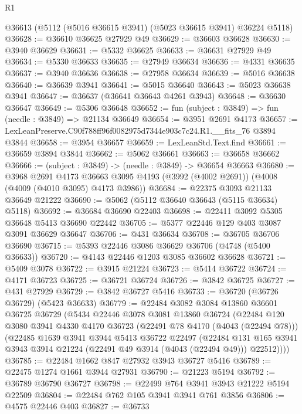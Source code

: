 \begin{lexlean}{R1}
\begin{coremodule}
  @36613 (@5112 (@5016 @36615 @3941) (@5023 @36615 @3941) @36224 @5118)
@36628 := @36610 @36625 @27929 @49
@36629 := @36603 @36628
@36630 := @3940 @36629
@36631 := @5332 @36625
@36633 := @36631 @27929 @49
@36634 := @5330 @36633
@36635 := @27949 @36634
@36636 := @4331 @36635
@36637 := @3940 @36636
@36638 := @27958 @36634
@36639 := @5016 @36638
@36640 := @36639 @3941
@36641 := @5015 @36640
@36643 := @5023 @36638 @3941
@36647 := @36637 (@36641 @36643 @4261 @3943)
@36648 := @36630 @36647
@36649 := @5306 @36648
@36652 := fun (subject : @3849) => fun (needle : @3849) => @21134 @36649
@36654 := @3951 @2691 @4173
@36657 := LexLeanPreserve.C90f788ff96f0082975d7344e903c7c24.R1.__fits_76 @3894 @3844
@36658 := @3954 @36657
@36659 := LexLeanStd.Text.find
@36661 := @36659 @3894 @3844
@36662 := @5062 @36661
@36663 := @36658 @36662
@36666 := (subject : @3849) -> (needle : @3849) -> @36654 @36663
@36680 := @3968
    @2691
    @4173
    @36663
    @3095
    @4193
    (@3992 (@4002 @2691))
    (@4008 (@4009 (@4010 @3095) @4173 @3986))
@36684 := @22375 @3093 @21133 @36649 @21222
@36690 := @5062 (@5112 @36640 @36643 (@5115 @36634) @5118)
@36692 := @36684 @36690 @22403
@36698 := @22411 @3092 @5305 @36648 @5413 @36690 @22442
@36705 := @5377 @22446 @129 @403 @3087 @3091 @36629 @36647
@36706 := @431 @36634
@36708 := @36705 @36706 @36690
@36715 := @5393 @22446 @3086 @36629 @36706 (@4748 (@5400 @36633))
@36720 := @4143 @22446 @1203 @3085 @36602 @36628
@36721 := @5409 @3078
@36722 := @3915 @21224
@36723 := @5414 @36722
@36724 := @4171 @36723
@36725 := @36721 @36724
@36726 := @3842 @36725
@36727 := @431 @27929
@36729 := @3842 @36727 @5416
@36733 := @36720 (@36726 @36729) (@5423 @36633)
@36779 := @22484
    @3082
    @3084
    @13860
    @36601
    @36725
    @36729
    (@5434
      @22446
      @3078
      @3081
      @13860
      @36724
      (@22484
        @120
        @3080
        @3941
        @4330
        @4170
        @36723
        (@22491 @78 @4170 (@4043 (@22494 @78)))
        (@22485
          @1639
          @3941
          @3944
          @5413
          @36722
          @22497
          (@22484
            @131
            @165
            @3941
            @3943
            @3914
            @21224
            (@22491 @49 @3914 (@4043 (@22494 @49)))
            @22512))))
@36785 := @22484 @1662 @847 @27932 @3943 @36727 @5416
@36789 := @22475 @1274 @1661 @3944 @27931
@36790 := @21223 @5194
@36792 := @36789 @36790 @36727
@36798 := @22499 @764 @3941 @3943 @21222 @5194 @22509
@36804 := @22484 @762 @105 @3941 @3941 @761 @3856
@36806 := @4575 @22446 @403
@36827 := @36733

\end{coremodule}
\end{lexlean}
